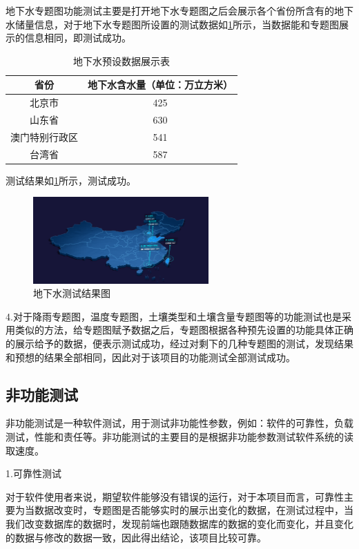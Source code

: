 地下水专题图功能测试主要是打开地下水专题图之后会展示各个省份所含有的地下水储量信息，对于地下水专题图所设置的测试数据如\ref{xushuici}所示，当数据能和专题图展示的信息相同，即测试成功。
\begin{table}[H]
	\centering
	\caption[地下水数据]{地下水预设数据展示表}
	\label{xushuici}
	\begin{tabular}{cc}
		\toprule
		省份          & 地下水含水量（单位：万立方米）    \\
		\midrule
		北京市        &425  \\
		山东省     &630 \\
		澳门特别行政区    &  541    \\
		台湾省     &587    \\
		
		
		\bottomrule
	\end{tabular}
\end{table}
测试结果如\ref{fig:ceshidixiashui}所示，测试成功。
\begin{figure}[!htb]%
	\centering
	\includegraphics[width=0.60\textwidth,height=0.3\textheight]{figs/ceshidixiashui.png}
	\caption{地下水测试结果图}
	\label{fig:ceshidixiashui}
\end{figure}

4.对于降雨专题图，温度专题图，土壤类型和土壤含量专题图等的功能测试也是采用类似的方法，给专题图赋予数据之后，专题图根据各种预先设置的功能具体正确的展示给予的数据，便表示测试成功，经过对剩下的几种专题图的测试，发现结果和预想的结果全部相同，因此对于该项目的功能测试全部测试成功。
\subsection{非功能测试}
非功能测试是一种软件测试，用于测试非功能性参数，例如：软件的可靠性，负载测试，性能和责任等。非功能测试的主要目的是根据非功能参数测试软件系统的读取速度。

1.可靠性测试

对于软件使用者来说，期望软件能够没有错误的运行，对于本项目而言，可靠性主要为当数据改变时，专题图是否能够实时的展示出变化的数据，在测试过程中，当我们改变数据库的数据时，发现前端也跟随数据库的数据的变化而变化，并且变化的数据与修改的数据一致，因此得出结论，该项目比较可靠。

